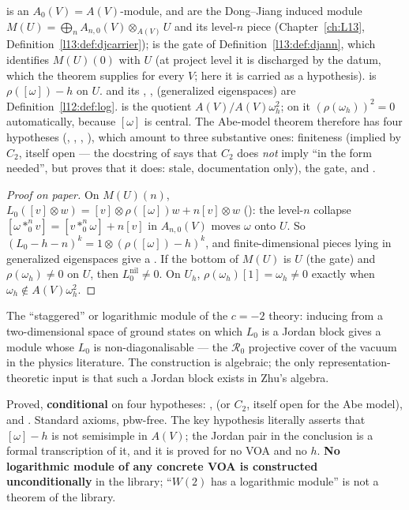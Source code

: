 \begin{dictionary}
 is an $A_0(V)=A(V)$-module,  and  are the Dong--Jiang
induced module $M(U)=\bigoplus_nA_{n,0}(V)\otimes_{A(V)}U$ and its level-$n$ piece (Chapter~\ref{ch:L13},
Definition~\ref{l13:def:djcarrier});  is the gate of Definition~\ref{l13:def:djann}, which
identifies $M(U)(0)$ with $U$ (at project level it is discharged by the  datum, which
the theorem  supplies for every $V$; here it is carried as a hypothesis).  is
$\rho([\omega])-h$ on $U$.  and its , ,  (generalized
eigenspaces) are Definition~\ref{l12:def:log}.  is the quotient $A(V)/A(V)\omega_h^2$;
on it $(\rho(\omega_h))^2=0$ automatically, because $[\omega]$ is central. The Abe-model theorem therefore has
four hypotheses (, , , ), which amount to three substantive ones: finiteness (implied by $C_2$, itself open --- the docstring of
 says that $C_2$ does \emph{not} imply  ``in the form needed'', but
 proves that it does: stale, documentation only), the gate, and
.
\end{dictionary}
\begin{proof}[Proof on paper]
On $M(U)(n)$, $L_0([v]\otimes w)=[v]\otimes\rho([\omega])w+n[v]\otimes w$ (): the level-$n$
collapse $[\omega*^n_0v]=[v*^n_0\omega]+n[v]$ in $A_{n,0}(V)$ moves $\omega$ onto $U$. So $(L_0-h-n)^k=1\otimes(\rho([\omega])-h)^k$,
and finite-dimensional pieces lying in generalized eigenspaces give a . If the bottom of
$M(U)$ is $U$ (the gate) and $\rho(\omega_h)\ne0$ on $U$, then $L_0^{\mathrm{nil}}\ne0$. On $U_h$,
$\rho(\omega_h)[1]=\omega_h\ne0$ exactly when $\omega_h\notin A(V)\omega_h^2$.
\end{proof}
\begin{physics}
The ``staggered'' or logarithmic module of the $c=-2$ theory: inducing from a two-dimensional space of ground
states on which $L_0$ is a Jordan block gives a module whose $L_0$ is non-diagonalisable --- the
$\mathcal R_0$ projective cover of the vacuum in the physics literature. The construction is algebraic; the
only representation-theoretic input is that such a Jordan block exists in Zhu's algebra.
\end{physics}
\begin{status}
Proved, \textbf{conditional} on four hypotheses: ,  (or $C_2$, itself open for the Abe model), 
and . Standard axioms, pbw-free. The key hypothesis  literally asserts that
$[\omega]-h$ is not semisimple in $A(V)$; the Jordan pair in the conclusion is a formal transcription of it, and it is proved for
no VOA and no $h$. \textbf{No logarithmic module of any concrete VOA is constructed unconditionally} in the library; ``$W(2)$ has
a logarithmic module'' is not a theorem of the library.
\end{status}

